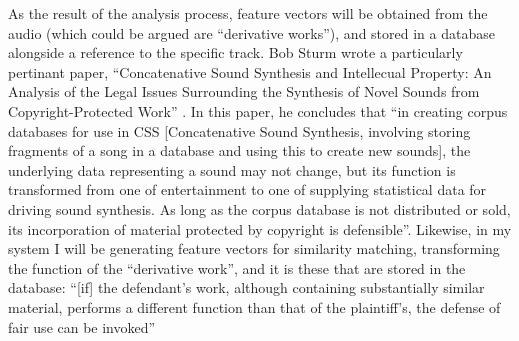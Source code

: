 As the result of the analysis process, feature vectors will be obtained from the
audio (which could be argued are ``derivative works''), and stored in a database
alongside a reference to the specific track. Bob Sturm wrote a particularly
pertinant paper, ``Concatenative Sound Synthesis and Intellecual Property: An
Analysis of the Legal Issues Surrounding the Synthesis of Novel Sounds from
Copyright-Protected Work'' \citep{Sturm2006}. In this paper, he concludes that
``in creating corpus databases for use in CSS [Concatenative Sound
Synthesis, involving storing fragments of a song in a database and
using this to create new sounds], the underlying data representing a
sound may not change, but its function is transformed from one of
entertainment to one of supplying statistical data for driving sound
synthesis. As long as the corpus database is not distributed or sold,
its incorporation of material protected by copyright is defensible''.
Likewise, in my system I will be generating feature vectors for similarity matching, transforming the function of the ``derivative work'', and it is these that are stored in the database: ``[if] the defendant's work, although containing
substantially similar material, performs a different function than that of the
plaintiff's, the defense of fair use can be invoked'' \citep{Copyright1988}
